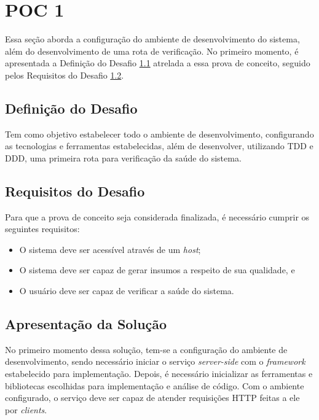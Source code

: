 \section{POC 1}
\label{section:poc_1}

Essa seção aborda a configuração do ambiente de desenvolvimento do sistema, 
além do desenvolvimento de uma rota de verificação.  No primeiro momento, 
é apresentada a Definição do Desafio \ref{section:poc_1_def_desafio} atrelada a essa prova de conceito, 
seguido pelos Requisitos do Desafio \ref{section:poc_1_req_desafio}.

\subsection{Definição do Desafio}
\label{section:poc_1_def_desafio}

Tem como objetivo estabelecer todo o ambiente de desenvolvimento, configurando as 
tecnologias e ferramentas estabelecidas, além de desenvolver, utilizando TDD e 
DDD, uma primeira rota para verificação da saúde do sistema.

\subsection{Requisitos do Desafio}
\label{section:poc_1_req_desafio}

Para que a prova de conceito seja considerada finalizada, é necessário cumprir os seguintes requisitos:

\begin{itemize}
  \item O sistema deve ser acessível através de um \textit{host};
  \item O sistema deve ser capaz de gerar insumos a respeito de sua qualidade, e 
  \item O usuário deve ser capaz de verificar a saúde do sistema.
\end{itemize}

\subsection{Apresentação da Solução}
\label{subsection:apresentacao_solucao}

No primeiro momento dessa solução, tem-se a configuração do ambiente de desenvolvimento, 
sendo necessário iniciar o serviço \textit{server-side} com o \textit{framework} estabelecido para 
implementação. Depois, é necessário inicializar as ferramentas e bibliotecas escolhidas para 
implementação e análise de código. Com o ambiente configurado, o serviço deve ser capaz de atender 
requisições HTTP feitas a ele por \textit{clients}.

